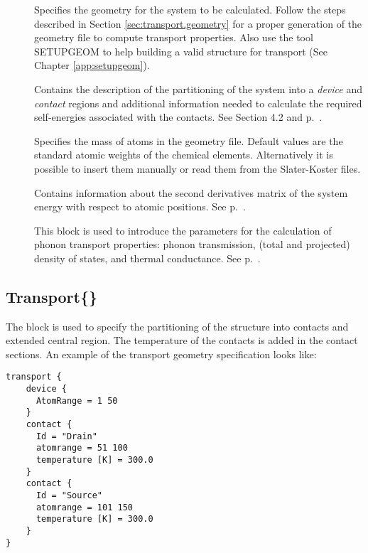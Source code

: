 \begin{description}
\item[] Specifies the geometry for the system to be calculated. 
	Follow the steps described in Section \ref{sec:transport.geometry} for a proper generation 
	of the geometry file to compute transport properties. Also use the tool SETUPGEOM to help
	building a valid structure for transport (See Chapter \ref{app:setupgeom}).
\item[] Contains the description of the partitioning of the system into a 
	{\em device} and {\em contact} regions and additional information needed to calculate the 
	required self-energies associated with the contacts. 
	See Section 4.2 and p.~.
\item[]  Specifies the mass of atoms in the geometry file. 
	Default values are the standard atomic weights of the chemical elements. Alternatively
	it is possible to insert them manually or read them from the Slater-Koster files.
\item[] Contains information about the second derivatives matrix of the system energy 
	with respect to atomic positions. See  p.~.
\item[] This block is used to introduce the parameters for the calculation of 
	phonon transport properties: phonon transmission, (total and projected) density of states, 
	and thermal conductance. See  p.~.
\end{description}

\subsection{Transport\{\}}
\label{sec:phonon.Transport}

The block  is used to specify the partitioning of the structure into contacts and 
extended central region. 
The temperature of the contacts is added in the contact sections. An example of the transport 
geometry specification looks like:

\begin{verbatim}
transport {
    device {
      AtomRange = 1 50
    }
    contact {
      Id = "Drain"
      atomrange = 51 100
      temperature [K] = 300.0
    }
    contact {
      Id = "Source"
      atomrange = 101 150
      temperature [K] = 300.0
    }
}
\end{verbatim}


